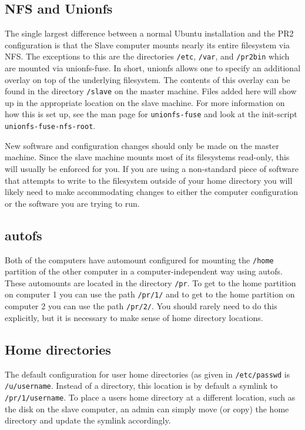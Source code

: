 \subsection{NFS and Unionfs}
The single largest difference between a normal Ubuntu installation and
the PR2 configuration is that the Slave computer mounts nearly its
entire filesystem via NFS.  The exceptions to this are the directories
\texttt{/etc}, \texttt{/var}, and \texttt{/pr2bin} which are mounted
via unionfs-fuse.  In short, unionfs allows one to specify an
additional overlay on top of the underlying filesystem.  The contents
of this overlay can be found in the directory \texttt{/slave} on the
master machine.  Files added here will show up in the appropriate
location on the slave machine.  For more information on how this is
set up, see the man page for \texttt{unionfs-fuse} and look at the
init-script \texttt{unionfs-fuse-nfs-root}.

New software and configuration changes should only be made on the
master machine.  Since the slave machine mounts most of its
filesystems read-only, this will usually be enforced for you.  If you
are using a non-standard piece of software that attempts to write to
the filesystem outside of your home directory you will likely need to
make accommodating changes to either the computer configuration or the
software you are trying to run.

\subsection{autofs}
Both of the computers have automount configured for mounting the
\texttt{/home} partition of the other computer in a
computer-independent way using autofs. These automounts are located in
the directory \texttt{/pr}. To get to the home partition on computer 1
you can use the path \texttt{/pr/1/} and to get to the home partition
on computer 2 you can use the path \texttt{/pr/2/}. You should rarely
need to do this explicitly, but it is necessary to make sense of home
directory locations.

\subsection{Home directories}
The default configuration for user home directories (as given in
\texttt{/etc/passwd} is \texttt{/u/username}.  Instead of a directory,
this location is by default a symlink to \texttt{/pr/1/username}.  To
place a users home directory at a different location, such as the disk
on the slave computer, an admin can simply move (or copy) the home
directory and update the symlink accordingly.

